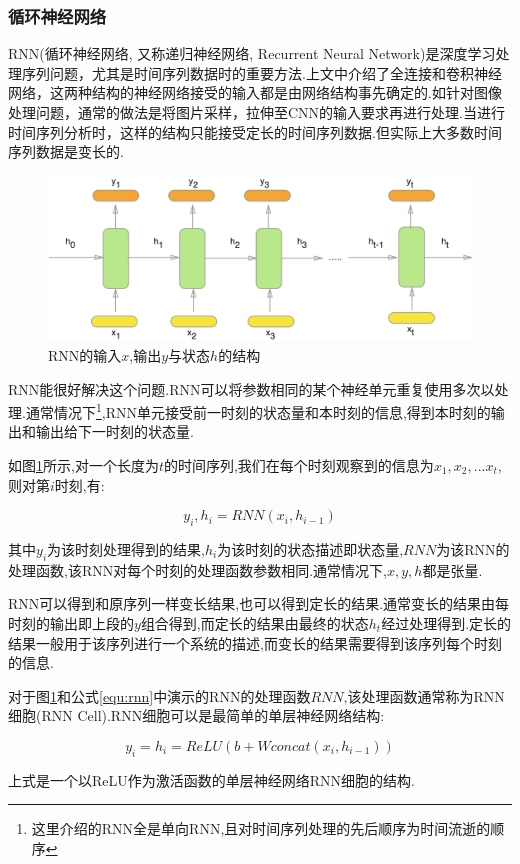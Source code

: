 \subsubsection{循环神经网络} \label{section:rnn}
RNN(循环神经网络, 又称递归神经网络, Recurrent Neural Network)是深度学习处理序列问题，尤其是时间序列数据时的重要方法.上文中介绍了全连接和卷积神经网络，这两种结构的神经网络接受的输入都是由网络结构事先确定的.如针对图像处理问题，通常的做法是将图片采样，拉伸至CNN的输入要求再进行处理.当进行时间序列分析时，这样的结构只能接受定长的时间序列数据.但实际上大多数时间序列数据是变长的.
\par
\begin{figure}[htbp!]
    \centering
    \includegraphics[width = 1.\textwidth]{chap/img/rnn.png}
    \caption{
        RNN的输入$x$,输出$y$与状态$h$的结构\supercite{how_rnn_work}
        }\label{fig:rnn}
\end{figure}
\par
RNN能很好解决这个问题.RNN可以将参数相同的某个神经单元重复使用多次以处理.通常情况下\footnote{这里介绍的RNN全是单向RNN,且对时间序列处理的先后顺序为时间流逝的顺序},RNN单元接受前一时刻的状态量和本时刻的信息,得到本时刻的输出和输出给下一时刻的状态量.
\par
如图\ref{fig:rnn}所示,对一个长度为$t$的时间序列,我们在每个时刻观察到的信息为$x_1, x_2, ...x_t$,则对第$i$时刻,有:
\par
\begin{equation} \label{equ:rnn} y_i,h_i = RNN(x_i, h_{i-1})  \end{equation}
\par
其中$y_i$为该时刻处理得到的结果,$h_i$为该时刻的状态描述即状态量,$RNN$为该RNN的处理函数,该RNN对每个时刻的处理函数参数相同.通常情况下,$x,y,h$都是张量.
\par
RNN可以得到和原序列一样变长结果,也可以得到定长的结果.通常变长的结果由每时刻的输出即上段的$y$组合得到,而定长的结果由最终的状态$h_t$经过处理得到.定长的结果一般用于该序列进行一个系统的描述,而变长的结果需要得到该序列每个时刻的信息.
\par
对于图\ref{fig:rnn}和公式\ref{equ:rnn}中演示的RNN的处理函数$RNN$,该处理函数通常称为RNN细胞(RNN Cell).RNN细胞可以是最简单的单层神经网络结构:
\par
\begin{equation} \label{equ:simple_rnn} y_i = h_i = ReLU(b + W concat(x_i, h_{i-1}))  \end{equation}
\par
上式是一个以ReLU作为激活函数的单层神经网络RNN细胞的结构.
\par

